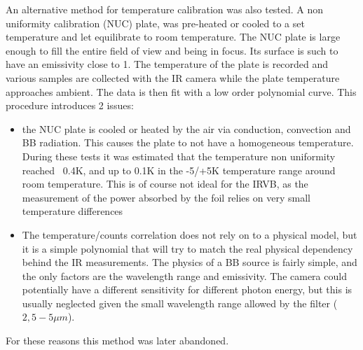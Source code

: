 An alternative method for temperature calibration was also tested. A non uniformity calibration (NUC) plate, was pre-heated or cooled to a set temperature and let equilibrate to room temperature. The NUC plate is large enough to fill the entire field of view and being in focus. Its surface is such to have an emissivity close to 1. The temperature of the plate is recorded and various samples are collected with the IR camera while the plate temperature approaches ambient. The data is then fit with a low order polynomial curve. This procedure introduces 2 issues:
\begin{itemize}
    \item the NUC plate is cooled or heated by the air via conduction, convection and BB radiation. This causes the plate to not have a homogeneous temperature. During these tests it was estimated that the temperature non uniformity reached ~0.4K, and up to 0.1K in the -5/+5K temperature range around room temperature. This is of course not ideal for the IRVB, as the measurement of the power absorbed by the foil relies on very small temperature differences
    \item The temperature/counts correlation does not rely on to a physical model, but it is a simple polynomial that will try to match the real physical dependency behind the IR measurements. The physics of a BB source is fairly simple, and the only factors are the wavelength range and emissivity. The camera could potentially have a different sensitivity for different photon energy, but this is usually neglected given the small wavelength range allowed by the filter ($2,5-5\mu m$).
\end{itemize}
For these reasons this method was later abandoned.

